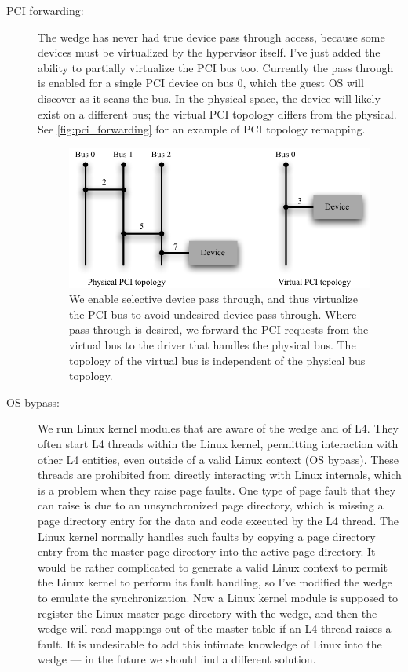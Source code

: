 \documentclass[10pt,a4paper]{article}
\begin{document}
\begin{description}

\item[PCI forwarding:] The wedge has never had
true device pass through access, because some devices must be
virtualized by the hypervisor itself.  I've just added the ability to
partially virtualize the PCI bus too.  Currently the pass through is
enabled for a single PCI device on bus 0, which the guest OS will
discover as it scans the bus.  In the physical space, the device will
likely exist on a different bus; the virtual PCI topology differs from
the physical.  See \autoref{fig:pci_forwarding} for an example of PCI
topology remapping.

\begin{figure}[tb]
  \centering
  \includegraphics{figures/PCI-forwarding.pdf}
  \caption[PCI forwarding.]{We enable selective device pass through,
  and thus virtualize the PCI bus to avoid undesired device pass
  through.  Where pass through is desired, we forward the PCI requests
  from the virtual bus to the driver that handles the physical bus.
  The topology of the virtual bus is independent of the physical bus
  topology.}
  \label{fig:pci_forwarding}
\end{figure}


\item[OS bypass:] We run Linux kernel modules that are aware of the
wedge and of L4.  They often start L4 threads within the Linux kernel,
permitting interaction with other L4 entities, even outside of a valid
Linux context (OS bypass).  These threads are prohibited from directly
interacting with Linux internals, which is a problem when they raise
page faults.  One type of page fault that they can raise is due to an
unsynchronized page directory, which is missing a page directory entry
for the data and code executed by the L4 thread.  The Linux kernel
normally handles such faults by copying a page directory entry from
the master page directory into the active page directory.  It would be
rather complicated to generate a valid Linux context to permit the
Linux kernel to perform its fault handling, so I've modified the wedge
to emulate the synchronization.  Now a Linux kernel module is supposed to
register the Linux master page directory with the wedge, and then the
wedge will read mappings out of the master table if an L4 thread
raises a fault.  It is undesirable to add this intimate knowledge of
Linux into the wedge --- in the future we should find a different
solution.

\end{description}
\end{document}
